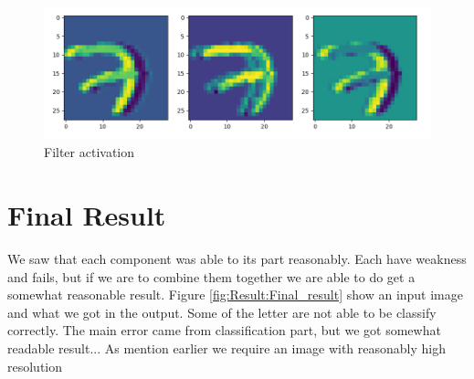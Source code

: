 \documentclass[Report.tex]{subfiles}
\begin{document}
\begin{figure}[!htb]
\includegraphics[width=\textwidth]{res/filter_view.png}
\caption{Filter activation}
\label{fig_filter_view}
\end{figure}

\newpage
\section{Final Result}
We saw that each component was able to its part reasonably. Each have weakness and fails, but if we are to combine them together we are able to do get a somewhat reasonable result. Figure \ref{fig:Result:Final_result} show an input image and what we got in the output. Some of the letter are not able to be classify correctly. The main error came from classification part, but we got somewhat readable result... As mention earlier we require an image with reasonably high resolution 
\end{document}
